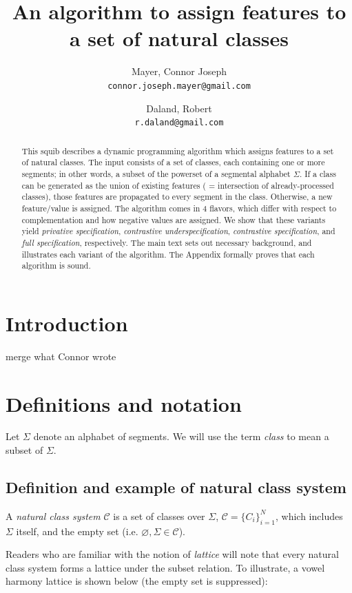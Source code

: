 \documentclass[11pt, oneside]{article}   	%
\title{An algorithm to assign features to a set of natural classes}
\author{}
\author{
  Mayer, Connor Joseph \\
  \texttt{connor.joseph.mayer@gmail.com}
  \and
  Daland, Robert \\
  \texttt{r.daland@gmail.com}
}
\begin{document}
\maketitle

\begin{abstract}
This squib describes a dynamic programming algorithm which assigns features to a set of natural classes. The input consists of a set of classes, each containing one or more segments; in other words, a subset of the powerset of a segmental alphabet $\Sigma$. If a class can be generated as the union of existing features ( = intersection of already-processed classes), those features are propagated to every segment in the class. Otherwise, a new feature/value is assigned. The algorithm comes in 4 flavors, which differ with respect to complementation and how negative values are assigned. We show that these variants yield \textit{privative specification}, \textit{contrastive underspecification}, \textit{contrastive specification}, and \textit{full specification}, respectively. The main text sets out necessary background, and illustrates each variant of the algorithm. The Appendix formally proves that each algorithm is sound.
\end{abstract}

\section{Introduction}
merge what Connor wrote

\section{Definitions and notation}

Let $\Sigma$ denote an alphabet of segments. We will use the term \textit{class} to mean a subset of $\Sigma$. 

\subsection{Definition and example of natural class system}

A \textit{natural class system} $\mathcal C$ is a set of classes over $\Sigma$, $\mathcal C = \{C_i\}_{i=1}^N$, which includes $\Sigma$ itself, and the empty set (i.e. $\varnothing , \Sigma \in \mathcal C$).

Readers who are familiar with the notion of \textit{lattice} will note that every natural class system forms a lattice under the subset relation. To illustrate, a vowel harmony lattice is shown below (the empty set is suppressed):
\end{document}
